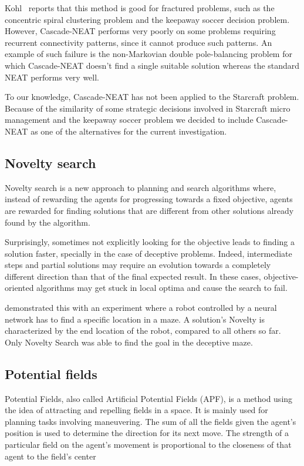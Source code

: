 Kohl~\cite{Kohl09FracturedProblems, Kohl09StrategicDecisions} reports that this method is good for
fractured problems, such as the concentric spiral clustering problem
and the keepaway soccer decision problem. However, Cascade-NEAT
performs very poorly on some problems requiring recurrent connectivity
patterns, since it cannot produce such patterns. An example of such
failure is the non-Markovian double pole-balancing problem for which
Cascade-NEAT doesn't find a single suitable solution whereas the
standard NEAT performs very well.

To our knowledge, Cascade-NEAT has not been applied to the Starcraft
problem. Because of the similarity of some strategic decisions
involved in Starcraft micro management and the keepaway soccer problem
we decided to include Cascade-NEAT as one of the alternatives for the
current investigation.

\subsection{Novelty search}\label{subsec:novelty-search}

Novelty search is a new approach to planning and search algorithms
where, instead of rewarding the agents for progressing towards a fixed
objective, agents are rewarded for finding solutions that are different
from other solutions already found by the algorithm.

Surprisingly, sometimes not explicitly looking for the objective leads
to finding a solution faster, specially in the case of deceptive
problems.  Indeed, intermediate steps and partial solutions may
require an evolution towards a completely different direction than
that of the final expected result. In these cases, objective-oriented
algorithms may get stuck in local optima and cause the search to
fail.

\citet{Lehman11Novelty} demonstrated this with an experiment where a
robot controlled by a neural network has to find a specific location
in a maze. A solution's Novelty is characterized by the end location
of the robot, compared to all others so far. Only Novelty Search was
able to find the goal in the deceptive maze.

\subsection{Potential fields}\label{subsec:potential-fields}

Potential Fields, also called Artificial Potential Fields (APF), is a
method using the idea of attracting and repelling fields in a
space. It is mainly used for planning tasks involving maneuvering.
The sum of all the fields given the agent's position is used to
determine the direction for its next move. The strength of a
particular field on the agent's movement is proportional to the
closeness of that agent to the field's center

